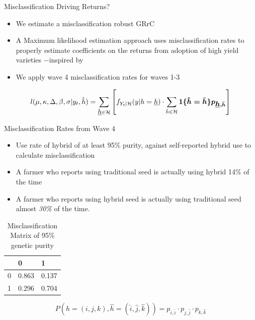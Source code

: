 \documentclass{beamer}
\begin{document}
\begin{frame}{Misclassification Driving Returns?}
\begin{itemize}
    \item We estimate a misclassification robust GRrC 
    \item A Maximum likelihood estimation approach uses misclassification rates to properly estimate coefficients on the returns from adoption of high yield varieties $-$inspired by \cite{michuda2021three}
    \item We apply wave 4 misclassification rates for waves 1-3
\end{itemize}

\begin{equation*}
\label{eq:mr-GRrC}
l(\mu, \kappa, \Delta, \beta, \sigma|y_{t}, \hat{h}) = \sum_{\underbar{$h$}\in\mathcal{H}} \left[ f_{Y_{t}| \mathcal{H}}(y|h=\underbar{$h$})\cdot  \sum_{\bar{h} \in \mathcal{H}} \boldsymbol{1\{\hat{h}=\bar{h}\} p_{\underbar{$h$}, \bar{h}}} \right]
\end{equation*}

\end{frame}

\begin{frame}{Misclassification Rates from Wave 4}

\begin{itemize}
    \item Use rate of hybrid of at least 95\% purity, against self-reported hybrid use to calculate misclassification
    \item A farmer who reports using traditional seed is actually using hybrid 14\% of the time
    \item A farmer who reports using hybrid seed is actually using traditional seed almost \textit{30\%} of the time.
\end{itemize}
    \begin{table}[]
        \centering
        \begin{tabular}{lll}
        \toprule
         & 0 & 1 \\
        \midrule
        0 & 0.863 & 0.137 \\
        1 & 0.296 & 0.704 \\
        \bottomrule
        \end{tabular}
        \caption{Misclassification Matrix of 95\% genetic purity}
    \end{table}
    
\begin{equation}
    \label{eq:misclass}
    P(h = (i,j,k) , \hat{h} = (\hat{i},\hat{j}, \hat{k})) = p_{i, \hat{i}}\cdot p_{j, \hat{j}}\cdot p_{k, \hat{k}}
\end{equation}
\end{frame}
\end{document}

